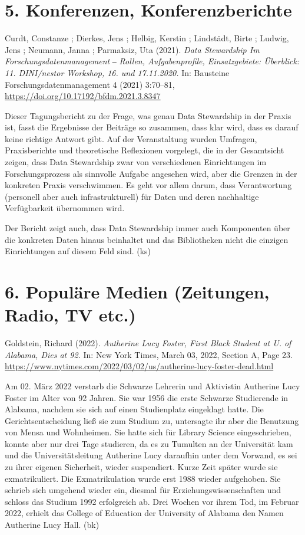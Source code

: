 \documentclass[a4paper,
fontsize=11pt,
oneside,
numbers=noperiodatend,
parskip=half-,
bibliography=totoc,
final
]{scrartcl}
\begin{document}
\hypertarget{konferenzen-konferenzberichte}{%
\section{5. Konferenzen,
Konferenzberichte}\label{konferenzen-konferenzberichte}}

Curdt, Constanze ; Dierkes, Jens ; Helbig, Kerstin ; Lindstädt, Birte ;
Ludwig, Jens ; Neumann, Janna ; Parmaksiz, Uta (2021). \emph{Data
Stewardship Im Forschungsdatenmanagement} ‒ \emph{Rollen,
Aufgabenprofile, Einsatzgebiete: Überblick: 11. DINI/nestor Workshop,
16. und 17.11.2020.} In: Bausteine Forschungsdatenmanagement 4 (2021)
3:70--81, \url{https://doi.org/10.17192/bfdm.2021.3.8347}

Dieser Tagungsbericht zu der Frage, was genau Data Stewardship in der
Praxis ist, fasst die Ergebnisse der Beiträge so zusammen, dass klar
wird, dass es darauf keine richtige Antwort gibt. Auf der Veranstaltung
wurden Umfragen, Praxisberichte und theoretische Reflexionen vorgelegt,
die in der Gesamtsicht zeigen, dass Data Stewardship zwar von
verschiedenen Einrichtungen im Forschungsprozess als sinnvolle Aufgabe
angesehen wird, aber die Grenzen in der konkreten Praxis verschwimmen.
Es geht vor allem darum, dass Verantwortung (personell aber auch
infrastrukturell) für Daten und deren nachhaltige Verfügbarkeit
übernommen wird.

Der Bericht zeigt auch, dass Data Stewardship immer auch Komponenten
über die konkreten Daten hinaus beinhaltet und das Bibliotheken nicht
die einzigen Einrichtungen auf diesem Feld sind. (ks)

\hypertarget{populuxe4re-medien-zeitungen-radio-tv-etc.}{%
\section{6. Populäre Medien (Zeitungen, Radio, TV
etc.)}\label{populuxe4re-medien-zeitungen-radio-tv-etc.}}

Goldstein, Richard (2022). \emph{Autherine Lucy Foster, First Black
Student at U. of Alabama, Dies at 92.} In: New York Times, March 03,
2022, Section A, Page 23.
\url{https://www.nytimes.com/2022/03/02/us/autherine-lucy-foster-dead.html}

Am 02. März 2022 verstarb die Schwarze Lehrerin und Aktivistin Autherine
Lucy Foster im Alter von 92 Jahren. Sie war 1956 die erste Schwarze
Studierende in Alabama, nachdem sie sich auf einen Studienplatz
eingeklagt hatte. Die Gerichtsentscheidung ließ sie zum Studium zu,
untersagte ihr aber die Benutzung von Mensa und Wohnheimen. Sie hatte
sich für Library Science eingeschrieben, konnte aber nur drei Tage
studieren, da es zu Tumulten an der Universität kam und die
Universitätsleitung Autherine Lucy daraufhin unter dem Vorwand, es sei
zu ihrer eigenen Sicherheit, wieder suspendiert. Kurze Zeit später wurde
sie exmatrikuliert. Die Exmatrikulation wurde erst 1988 wieder
aufgehoben. Sie schrieb sich umgehend wieder ein, diesmal für
Erziehungswissenschaften und schloss das Studium 1992 erfolgreich ab.
Drei Wochen vor ihrem Tod, im Februar 2022, erhielt das College of
Education der University of Alabama den Namen Autherine Lucy Hall. (bk)
\end{document}
